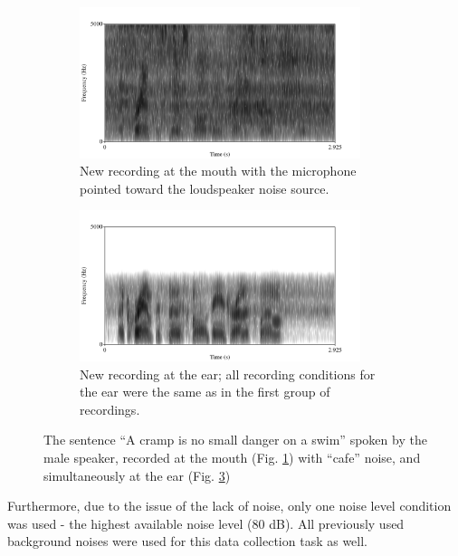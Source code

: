 \documentclass[dissertation,copyright]{uathesis}
\begin{document}
\begin{figure}
\begin{subfigure}{0.5\textwidth}
  \centering
  \includegraphics[width=0.9\textwidth]{figure/spectNewMouthNoise.png}
  \caption{New recording at the mouth with the microphone pointed toward the loudspeaker noise source.}
  \label{fig:spectNewMouthNoise}
\end{subfigure}
\begin{subfigure}{0.5\textwidth}
  \centering
  \includegraphics[width=0.9\textwidth]{figure/spectNewEarNoise.png}
  \caption{New recording at the ear; all recording conditions for the ear were the same as in the first group of recordings.}
  \label{fig:spectNewEarNoise}
\end{subfigure}
\caption{The sentence ``A cramp is no small danger on a swim'' spoken by the male speaker, recorded at the mouth (Fig. \ref{fig:spectNewMouthNoise}) with ``cafe'' noise, and simultaneously at the ear (Fig. \ref{fig:spectNewEarNoise})}
\end{figure}


Furthermore, due to the issue of the lack of noise, only one noise level condition was used - the highest available noise level (80 dB).  All previously used background noises were used for this data collection task as well.
\end{document}
